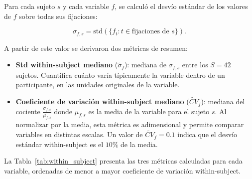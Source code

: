 
Para cada sujeto $s$ y cada variable $f$, se calculó el desvío estándar de los valores de $f$ sobre todas sus fijaciones:

\begin{equation}
    \sigma_{f,s} = \text{std}\left(\{f_t : t \in \text{fijaciones de } s\}\right).
\end{equation}

A partir de este valor se derivaron dos métricas de resumen:

\begin{itemize}
    \item \textbf{Std within-subject mediano} ($\widetilde{\sigma}_f$): 
    mediana de $\sigma_{f,s}$ entre los $S = 42$ sujetos. Cuantifica 
    cuánto varía típicamente la variable dentro de un participante, en 
    las unidades originales de la variable.

    \item \textbf{Coeficiente de variación within-subject mediano} 
    ($\widetilde{CV}_f$): mediana del cociente $\frac{\sigma_{f,s} }{\mu_{f,s}}$
    donde $\mu_{f,s}$ es la media de la variable para el sujeto $s$. Al 
    normalizar por la media, esta métrica es adimensional y permite 
    comparar variables en distintas escalas. Un valor de $\widetilde{CV}_f = 0.1$ 
    indica que el desvío estándar within-subject es el $10\%$ de la media.

\end{itemize}

La Tabla~\ref{tab:within_subject} presenta las tres métricas calculadas
para cada variable, ordenadas de menor a mayor coeficiente de variación
within-subject.

